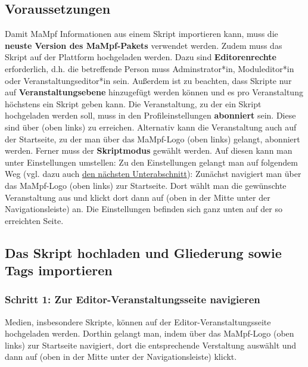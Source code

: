 \documentclass[parskip=off,index=totocnumbered]{scrartcl}
\begin{document}
\subsection{Voraussetzungen}
Damit MaMpf Informationen aus einem Skript importieren kann, muss die \textsf{\textbf{neuste Version des MaMpf-Pakets}} verwendet werden. Zudem muss das Skript auf der Plattform hochgeladen werden. Dazu sind \textsf{\textbf{Editorenrechte}} erforderlich, d.h. die betreffende Person muss Adminstrator*in, Moduleditor*in oder Veranstaltungseditor*in sein. Außerdem ist zu beachten, dass Skripte nur auf \textsf{\textbf{Veranstaltungsebene}} hinzugefügt werden können und es pro Veranstaltung höchstens ein Skript geben kann. Die Veranstaltung, zu der ein Skript hochgeladen werden soll, muss in den Profileinstellungen \textsf{\textbf{abonniert}} sein. Diese sind über \userset (oben links) zu erreichen. Alternativ kann die Veranstaltung auch auf der Startseite, zu der man über das MaMpf-Logo (oben links) gelangt, abonniert werden. Ferner muss der \textsf{\textbf{Skriptmodus}} gewählt werden. Auf diesen kann man unter \textsf{Einstellungen} umstellen: Zu den \textsf{Einstellungen} gelangt man auf folgendem Weg (vgl. dazu auch \hyperref[subsec:import]{den nächsten Unterabschnitt}): Zunächst navigiert man über das MaMpf-Logo (oben links) zur Startseite. Dort wählt man die gewünschte Veranstaltung aus und klickt dort dann auf \edit (oben in der Mitte unter der Navigationsleiste) an. Die \textsf{Einstellungen} befinden sich ganz unten auf der so erreichten Seite.


\subsection{Das Skript hochladen und Gliederung sowie Tags importieren} \label{subsec:import}
\subsubsection*{Schritt 1: Zur Editor-Veranstaltungsseite navigieren}
Medien, insbesondere Skripte, können auf der Editor-Veranstaltungsseite hochgeladen werden. Dorthin gelangt man, indem über das MaMpf-Logo (oben links) zur Startseite navigiert, dort die entsprechende Verstaltung auswählt und dann auf \edit (oben in der Mitte unter der Navigationsleiste) klickt.
\vspace{0.6cm}
\end{document}
